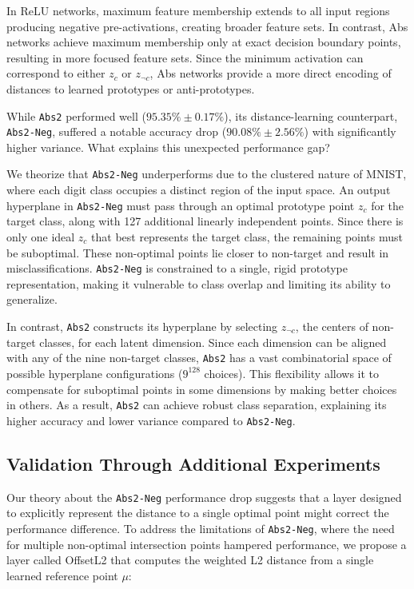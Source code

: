 In ReLU networks, maximum feature membership extends to all input regions producing negative pre-activations, creating broader feature sets. In contrast, Abs networks achieve maximum membership only at exact decision boundary points, resulting in more focused feature sets. Since the minimum activation can correspond to either $z_c$ or $z_{\neg c}$, Abs networks provide a more direct encoding of distances to learned prototypes or anti-prototypes.

While \texttt{Abs2} performed well ($95.35\% \pm 0.17\%$), its distance-learning counterpart, \texttt{Abs2-Neg}, suffered a notable accuracy drop ($90.08\% \pm 2.56\%$) with significantly higher variance. What explains this unexpected performance gap?

We theorize that \texttt{Abs2-Neg} underperforms due to the clustered nature of MNIST, where each digit class occupies a distinct region of the input space. An output hyperplane in \texttt{Abs2-Neg} must pass through an optimal prototype point $z_c$ for the target class, along with 127 additional linearly independent points. Since there is only one ideal $z_c$ that best represents the target class, the remaining points must be suboptimal. These non-optimal points lie closer to non-target and result in misclassifications. \texttt{Abs2-Neg} is constrained to a single, rigid prototype representation, making it vulnerable to class overlap and limiting its ability to generalize.

In contrast, \texttt{Abs2} constructs its hyperplane by selecting $z_{\neg c}$, the centers of non-target classes, for each latent dimension. Since each dimension can be aligned with any of the nine non-target classes, \texttt{Abs2} has a vast combinatorial space of possible hyperplane configurations ($9^{128}$ choices). This flexibility allows it to compensate for suboptimal points in some dimensions by making better choices in others. As a result, \texttt{Abs2} can achieve robust class separation, explaining its higher accuracy and lower variance compared to \texttt{Abs2-Neg}.

\subsection{Validation Through Additional Experiments}

Our theory about the \texttt{Abs2-Neg} performance drop suggests that a layer designed to explicitly represent the distance to a single optimal point might correct the performance difference. To address the limitations of \texttt{Abs2-Neg}, where the need for multiple non-optimal intersection points hampered performance, we propose a layer called OffsetL2 that computes the weighted L2 distance from a single learned reference point $\mu$:

